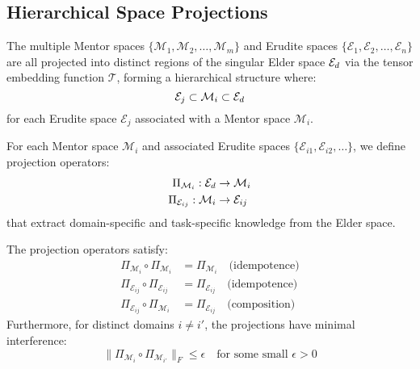 \subsection{Hierarchical Space Projections}

\begin{corollary}
The multiple Mentor spaces $\{\mathcal{M}_1, \mathcal{M}_2, \ldots, \mathcal{M}_m\}$ and Erudite spaces $\{\mathcal{E}_1, \mathcal{E}_2, \ldots, \mathcal{E}_n\}$ are all projected into distinct regions of the singular Elder space $\mathcal{E}_{d}$ via the tensor embedding function $\mathcal{T}$, forming a hierarchical structure where:
\begin{equation}
\mathcal{E}_j \subset \mathcal{M}_i \subset \mathcal{E}_{d}
\end{equation}
for each Erudite space $\mathcal{E}_j$ associated with a Mentor space $\mathcal{M}_i$.
\end{corollary}

\begin{definition}
For each Mentor space $\mathcal{M}_i$ and associated Erudite spaces $\{\mathcal{E}_{i1}, \mathcal{E}_{i2}, \ldots\}$, we define projection operators:
\begin{align}
\Pi_{\mathcal{M}_i}: \mathcal{E}_{d} &\rightarrow \mathcal{M}_i \\
\Pi_{\mathcal{E}_{ij}}: \mathcal{M}_i &\rightarrow \mathcal{E}_{ij}
\end{align}
that extract domain-specific and task-specific knowledge from the Elder space.
\end{definition}

\begin{proposition}
The projection operators satisfy:
\begin{align}
\Pi_{\mathcal{M}_i} \circ \Pi_{\mathcal{M}_i} &= \Pi_{\mathcal{M}_i} \quad \text{(idempotence)}\\
\Pi_{\mathcal{E}_{ij}} \circ \Pi_{\mathcal{E}_{ij}} &= \Pi_{\mathcal{E}_{ij}} \quad \text{(idempotence)}\\
\Pi_{\mathcal{E}_{ij}} \circ \Pi_{\mathcal{M}_i} &= \Pi_{\mathcal{E}_{ij}} \quad \text{(composition)}
\end{align}
Furthermore, for distinct domains $i \neq i'$, the projections have minimal interference:
\begin{equation}
\| \Pi_{\mathcal{M}_i} \circ \Pi_{\mathcal{M}_{i'}} \|_F \leq \epsilon \quad \text{for some small } \epsilon > 0
\end{equation}
\end{proposition}

